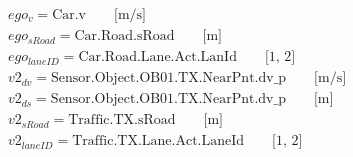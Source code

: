 \begin{equation*}
\begin{split}
ego_v = \text{Car.v} \qquad \text{[m/s]} \\
ego_{sRoad} = \text{Car.Road.sRoad} \qquad \text{[m]} \\
ego_{laneID} = \text{Car.Road.Lane.Act.LanId} \qquad \text{[1, 2]} \\
v2_{dv} = \text{Sensor.Object.OB01.TX.NearPnt.dv\_p} \qquad \text{[m/s]} \\
v2_{ds} = \text{Sensor.Object.OB01.TX.NearPnt.dv\_p} \qquad \text{[m]} \\
v2_{sRoad} = \text{Traffic.TX.sRoad} \qquad \text{[m]} \\
v2_{laneID} = \text{Traffic.TX.Lane.Act.LaneId} \qquad \text{[1, 2]} \\
\end{split}
\end{equation*}

